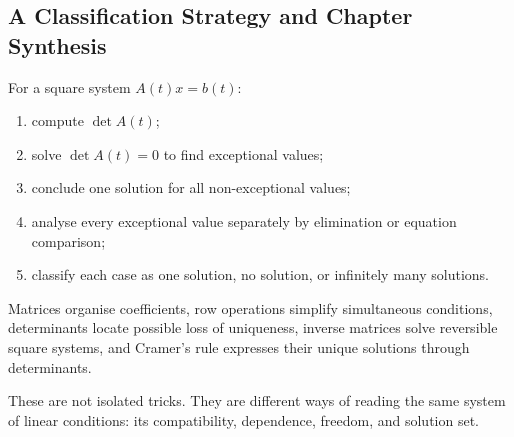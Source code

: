 \subsection{A Classification Strategy and Chapter Synthesis}

\begin{summarybox}
For a square system $A(t)x=b(t)$:
\begin{enumerate}
\item compute $\det A(t)$;
\item solve $\det A(t)=0$ to find exceptional values;
\item conclude one solution for all non-exceptional values;
\item analyse every exceptional value separately by elimination or equation comparison;
\item classify each case as one solution, no solution, or infinitely many solutions.
\end{enumerate}
\end{summarybox}

Matrices organise coefficients, row operations simplify simultaneous conditions, determinants locate possible loss of uniqueness, inverse matrices solve reversible square systems, and Cramer's rule expresses their unique solutions through determinants.

\begin{corebox}
These are not isolated tricks. They are different ways of reading the same system of linear conditions: its compatibility, dependence, freedom, and solution set.
\end{corebox}
